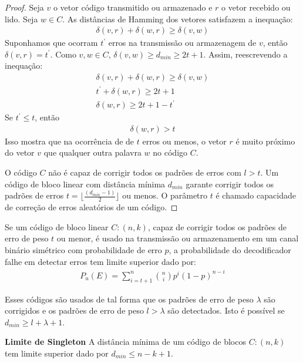 \begin{proof} Seja $v$ o vetor código transmitido ou armazenado e $r$ o vetor recebido ou lido. Seja $w \in C$. As distâncias de Hamming dos vetores satisfazem a inequação:
\begin{align*}
\delta(v,r)+\delta(w,r) \geq \delta(v,w)
\end{align*}
Suponhamos que ocorram $t^{'}$ erros na transmissão ou armazenagem de $v$, então $\delta(v,r)=t^{'}$. Como $v, w \in C$, $\delta(v,w) \geq d_{min} \geq 2t+1$. Assim, reescrevendo a inequação:
\begin{align*}
\delta(v,r)+\delta(w,r) \geq \delta(v,w)\\
t^{'}+\delta(w,r) \geq 2t+1\\
\delta(w,r) \geq 2t+1 - t^{'}
\end{align*}
Se $t^{'} \leq t$, então
\begin{align*}
\delta(w,r) > t
\end{align*}
Isso mostra que na ocorrência de de $t$ erros ou menos, o vetor $r$ é muito próximo do vetor $v$ que qualquer outra palavra $w$ no código $C$.

O código $C$ não é capaz de corrigir todos os padrões de erros com $l > t$.
Um código de bloco linear com distância mínima $d_{min}$ garante corrigir todos os padrões de erros $t=\lfloor \frac{(d_{min}-1)}{2} \rfloor$ ou menos. O parâmetro $t$ é chamado capacidade de correção de erros aleatórios de um código.
\end{proof}

Se um código de bloco linear $C:(n,k)$, capaz de corrigir todos os padrões de erro de peso $t$ ou menor, é usado na transmissão ou armazenamento em um canal binário simétrico com probabilidade de erro $p$, a probabilidade do decodificador falhe em detectar erros tem limite superior dado por:
\begin{align*}
P_u(E)=\displaystyle\sum_{i=t+1}^{n} \binom {n}{i} p^i(1 -p)^{n-i}
\end{align*}

Esses códigos são usados de tal forma que os padrões de erro de peso $\lambda$ são corrigidos e os padrões de erro de peso $l > \lambda$ são detectados. Isto é possível se $d_{min} \geq l + \lambda + 1$.

\begin{theorem} {\bf Limite de Singleton} \label{LimSingle}  A distância mínima de um código de blocos $C:(n,k)$ tem  limite superior dado por $d_{min} \leq n - k + 1$. 
\end{theorem}

